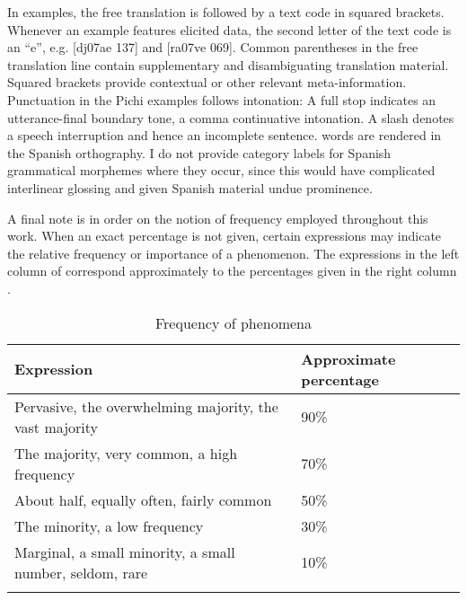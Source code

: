 In examples, the free translation is followed by a text code in squared brackets. Whenever an example features elicited data, the second letter of the text code is an “e”, e.g. [dj07ae 137] and [ra07ve 069]. Common parentheses in the free translation line contain supplementary and disambiguating translation material. Squared brackets provide contextual or other relevant meta-information. Punctuation in the Pichi examples follows intonation: A full stop indicates an utterance-final boundary tone, a comma continuative intonation. A slash denotes a speech interruption and hence an incomplete sentence.  words are rendered in the Spanish orthography. I do not provide category labels for Spanish grammatical morphemes where they occur, since this would have complicated interlinear glossing and given Spanish material undue prominence. 

A final note is in order on the notion of frequency employed throughout this work. When an exact percentage is not given, certain expressions may indicate the relative frequency or importance of a phenomenon. The expressions in the left column of  correspond approximately to the percentages given in the right column \citep{MichaelisEtAl2013}.

\begin{table}
\caption{Frequency of phenomena}
\label{ex:1:23}
\begin{tabularx}{\textwidth}{lY}
\lsptoprule
Expression& Approximate percentage\\
\midrule 
Pervasive, the overwhelming majority, the vast majority & 90\%\\
The majority, very common, a high frequency & 70\%\\
About half, equally often, fairly common & 50\%\\
The minority, a low frequency & 30\%\\
Marginal, a small minority, a small number, seldom, rare & 10\%\\
\lspbottomrule
\end{tabularx}
\end{table}


